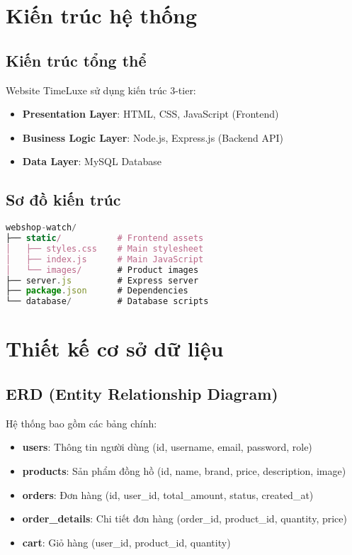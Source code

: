 \section{Kiến trúc hệ thống}

\subsection{Kiến trúc tổng thể}
Website TimeLuxe sử dụng kiến trúc 3-tier:
\begin{itemize}
    \item \textbf{Presentation Layer}: HTML, CSS, JavaScript (Frontend)
    \item \textbf{Business Logic Layer}: Node.js, Express.js (Backend API)
    \item \textbf{Data Layer}: MySQL Database
\end{itemize}

\subsection{Sơ đồ kiến trúc}
\begin{lstlisting}[language=JavaScript, title={Cấu trúc thư mục dự án}]
webshop-watch/
├── static/           # Frontend assets
│   ├── styles.css    # Main stylesheet
│   ├── index.js      # Main JavaScript
│   └── images/       # Product images
├── server.js         # Express server
├── package.json      # Dependencies
└── database/         # Database scripts
\end{lstlisting}

\section{Thiết kế cơ sở dữ liệu}

\subsection{ERD (Entity Relationship Diagram)}
Hệ thống bao gồm các bảng chính:
\begin{itemize}
    \item \textbf{users}: Thông tin người dùng (id, username, email, password, role)
    \item \textbf{products}: Sản phẩm đồng hồ (id, name, brand, price, description, image)
    \item \textbf{orders}: Đơn hàng (id, user\_id, total\_amount, status, created\_at)
    \item \textbf{order\_details}: Chi tiết đơn hàng (order\_id, product\_id, quantity, price)
    \item \textbf{cart}: Giỏ hàng (user\_id, product\_id, quantity)
\end{itemize}

